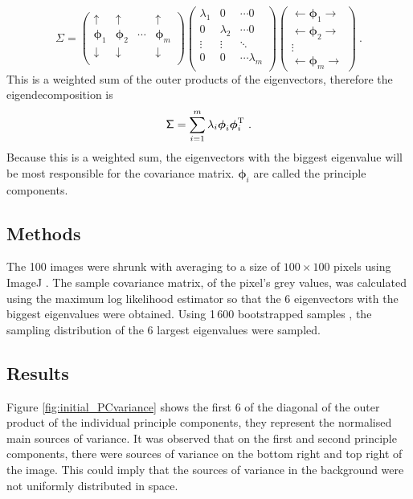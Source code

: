\documentclass[12pt]{report}
\newcommand{\T}{^\textup{T}}
\newcommand{\vectGreek}[1]{\boldsymbol{#1}}
\newcommand{\matr}[1]{\mathsf{#1}}
\begin{document}
\begin{equation*}
\matr{\Sigma}
=
\begin{pmatrix}
		\uparrow & \uparrow & & \uparrow \\
		\vectGreek{\phi}_1 & \vectGreek{\phi}_2 &\cdots& \vectGreek{\phi}_m \\
		\downarrow & \downarrow & & \downarrow \\
\end{pmatrix}
\begin{pmatrix}
	\lambda_1 & 0 & \cdots 0 \\
	0 & \lambda_2 & \cdots 0 \\
	\vdots & \vdots & \ddots \\
	0 & 0 & \cdots \lambda_m \\
\end{pmatrix}
\begin{pmatrix}
	\leftarrow\vectGreek{\phi}_1\rightarrow \\
	\leftarrow\vectGreek{\phi}_2\rightarrow \\
	\vdots \\
	\leftarrow\vectGreek{\phi}_m\rightarrow
\end{pmatrix} \ .
\end{equation*}
This is a weighted sum of the outer products of the eigenvectors, therefore the eigendecomposition is
\begin{equation}
\matr{\Sigma} = \sum_{i=1}^{m} \lambda_i \vectGreek{\phi}_i \vectGreek{\phi}_i\T \ .
\end{equation}
Because this is a weighted sum, the eigenvectors with the biggest eigenvalue will be most responsible for the covariance matrix. $\vectGreek{\phi}_i$ are called the principle components.

\subsection{Methods}
The 100 images were shrunk with averaging to a size of $100\times100$ pixels using ImageJ \cite{schindelin2012fiji}. The sample covariance matrix, of the pixel's grey values, was calculated using the maximum log likelihood estimator so that the 6 eigenvectors with the biggest eigenvalues were obtained. Using 1\,600 bootstrapped samples \cite{efron1992bootstrap}, the sampling distribution of the 6 largest eigenvalues were sampled.

\subsection{Results}
Figure \ref{fig:initial_PCvariance} shows the first 6 of the diagonal of the outer product of the individual principle components, they represent the normalised main sources of variance. It was observed that on the first and second principle components, there were sources of variance on the bottom right and top right of the image. This could imply that the sources of variance in the background were not uniformly distributed in space.
\end{document}
